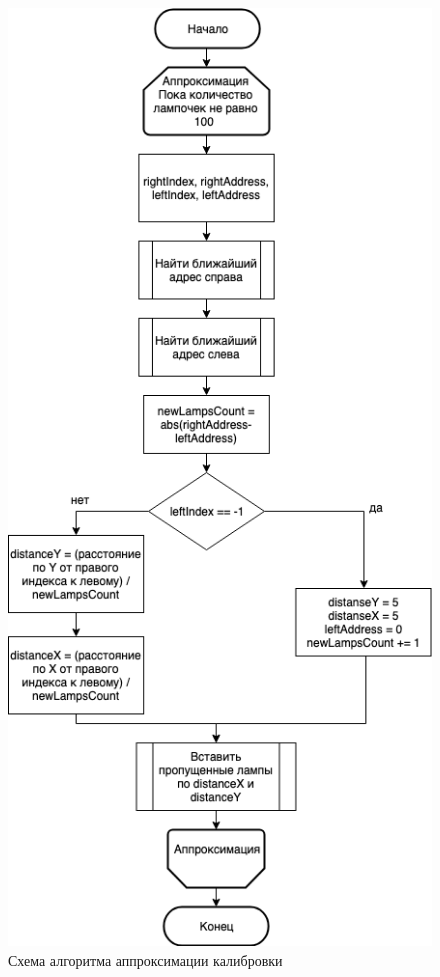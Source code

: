 \newpage
{}
\label{app:algorithms}

~
\begin{figure}[H]
\centering
	\includegraphics[scale=0.5]{figures/approximation.png}
	\caption{Схема алгоритма аппроксимации калибровки}
	\label{fig:appendices:algorithms:approximation}
\end{figure}
